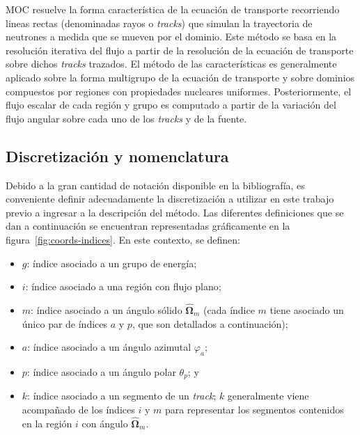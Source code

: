 \documentclass[11pt]{article}
\numberwithin{equation}{section}
\begin{document}
MOC resuelve la forma característica de la ecuación de transporte recorriendo lineas rectas (denominadas rayos o \emph{tracks}) que simulan la trayectoria de neutrones a medida que se mueven por el dominio. Este método se basa en la resolución iterativa del flujo a partir de la resolución de la ecuación de transporte sobre dichos \emph{tracks} trazados. El método de las características es generalmente aplicado sobre la forma multigrupo de la ecuación de transporte y sobre dominios compuestos por regiones con propiedades nucleares uniformes. Posteriormente, el flujo escalar de cada región y grupo es computado a partir de la variación del flujo angular sobre cada uno de los \emph{tracks} y de la fuente. 

\subsection{Discretización y nomenclatura}

Debido a la gran cantidad de notación disponible en la bibliografía, es conveniente definir adecuadamente la discretización a utilizar en este trabajo previo a ingresar a la descripción del método. Las diferentes definiciones que se dan a continuación se encuentran representadas gráficamente en la figura~\ref{fig:coords-indices}. En este contexto, se definen:

\begin{itemize}
\renewcommand\labelitemi{$\cdot$}
 \item $g$: índice asociado a un grupo de energía;
 \item $i$: índice asociado a una región con flujo plano;
 \item $m$: índice asociado a un ángulo s\'olido $\boldsymbol{\hat{\Omega}}_m$ (cada índice $m$ tiene asociado un único par de índices $a$ y $p$, que son detallados a continuación);
 \item $a$: índice asociado a un ángulo azimutal $\varphi_a$;
 \item $p$: índice asociado a un ángulo polar $\theta_p$; y
 \item $k$: índice asociado a un segmento de un \emph{track}; $k$ generalmente viene acompañado de los índices $i$ y $m$ para representar los segmentos contenidos en la región $i$ con ángulo $\boldsymbol{\hat{\Omega}}_m$.
\end{itemize}
\end{document}
